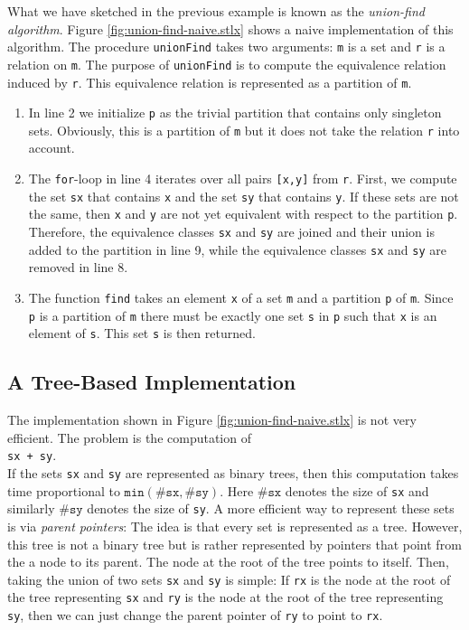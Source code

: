 What we have sketched in the previous example is known as the \emph{union-find algorithm}.
Figure \ref{fig:union-find-naive.stlx} shows a naive implementation of this algorithm.  The
procedure \texttt{unionFind} takes two arguments: \texttt{m} is a set and \texttt{r} is a relation
on \texttt{m}.  The purpose of \texttt{unionFind} is to compute the equivalence relation
induced by \texttt{r}.  This equivalence relation is represented as a partition of \texttt{m}.
\begin{enumerate}
\item In line 2 we initialize \texttt{p} as the trivial partition that contains only singleton
      sets.  Obviously, this is a partition of \texttt{m} but it does not take the
      relation \texttt{r} into account.
\item The \texttt{for}-loop in line 4 iterates over all pairs \texttt{[x,y]} from \texttt{r}.
      First, we compute the set \texttt{sx} that contains \texttt{x} and the set \texttt{sy} that
      contains \texttt{y}.  If these sets are not the same, then \texttt{x} and \texttt{y} are not
      yet equivalent with respect to the partition \texttt{p}.  Therefore, the equivalence classes
      \texttt{sx} and \texttt{sy} are joined and their union is added to the partition in line 9, while
      the equivalence classes \texttt{sx} and \texttt{sy} are removed in line 8.
\item The function \texttt{find} takes an element \texttt{x} of a set \texttt{m} and a partition
      \texttt{p} of \texttt{m}.  Since \texttt{p} is a partition of \texttt{m} there must be exactly
      one set \texttt{s} in \texttt{p} such that \texttt{x} is an element of \texttt{s}.  This set
      \texttt{s} is then returned.
\end{enumerate}

\subsection{A Tree-Based Implementation}
The implementation shown in Figure \ref{fig:union-find-naive.stlx} is not very efficient.  The
problem is the computation of 
\\[0.2cm]
\hspace*{1.3cm}
\texttt{sx + sy}.
\\[0.2cm]
If the sets \texttt{sx} and \texttt{sy} are represented as binary trees, then this computation takes
time proportional to $\mathtt{min}(\mathtt{\#sx},\mathtt{\#sy})$.  Here $\mathtt{\#sx}$ denotes the size of
\texttt{sx} and similarly $\mathtt{\#sy}$ denotes the size of \texttt{sy}.  A more efficient way to
represent these sets is via \emph{parent pointers}:  The idea is that every set is represented as a
tree.  However, this tree is not a binary tree but is rather represented by pointers that
point from the a node to its parent.  The node at the root of the tree points to itself.  Then, taking the
union of two sets \texttt{sx} and \texttt{sy} is simple:  If \texttt{rx} is the node at the root of
the tree representing \texttt{sx} and \texttt{ry} is the node at the root of the tree representing
\texttt{sy}, then we can just change the parent pointer of \texttt{ry} to point to \texttt{rx}.

